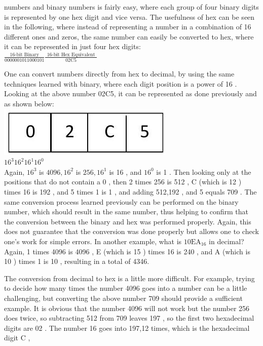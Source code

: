 \documentclass[10pt]{article}
\begin{document}
numbers and binary numbers is fairly easy, where each group of four binary digits is represented by one hex digit and vice versa. The usefulness of hex can be seen in the following, where instead of representing a number in a combination of 16 different ones and zeros, the same number can easily be converted to hex, where it can be represented in just four hex digits:\\
$\frac{\text { 16-bit Binary }}{0000001011000101} \frac{\text { 16-bit Hex Equivalent }}{02 \mathrm{C} 5}$

One can convert numbers directly from hex to decimal, by using the same techniques learned with binary, where each digit position is a power of 16 . Looking at the above number 02C5, it can be represented as done previously and as shown below:\\
\includegraphics[max width=\textwidth, center]{2025_03_24_ebe50cc223a6fbc49eecg-307}\\
$16^{3} 16^{2} 16^{1} 16^{0}$\\
Again, $16^{3}$ is $4096,16^{2}$ is $256,16^{1}$ is 16 , and $16^{0}$ is 1 . Then looking only at the positions that do not contain a 0 , then 2 times 256 is 512 , C (which is 12 ) times 16 is 192 , and 5 times 1 is 1 , and adding 512,192 , and 5 equals 709 . The same conversion process learned previously can be performed on the binary number, which should result in the same number, thus helping to confirm that the conversion between the binary and hex was performed properly. Again, this does not guarantee that the conversion was done properly but allows one to check one's work for simple errors. In another example, what is $10 \mathrm{EA}_{16}$ in decimal? Again, 1 times 4096 is 4096 , E (which is 15 ) times 16 is 240 , and A (which is 10 ) times 1 is 10 , resulting in a total of 4346.

The conversion from decimal to hex is a little more difficult. For example, trying to decide how many times the number 4096 goes into a number can be a little challenging, but converting the above number 709 should provide a sufficient example. It is obvious that the number 4096 will not work but the number 256 does twice, so subtracting 512 from 709 leaves 197 , so the first two hexadecimal digits are 02 . The number 16 goes into 197,12 times, which is the hexadecimal digit C ,
\end{document}
